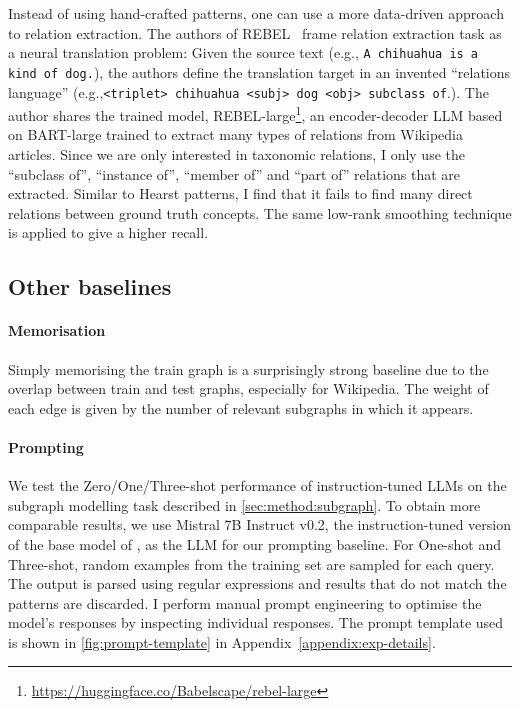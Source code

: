 Instead of using hand-crafted patterns, one can use a more data-driven approach to relation extraction. The authors of REBEL~\cite{cabot2021rebel} frame relation extraction task as a neural translation problem: Given the source text (e.g., \texttt{A chihuahua is a kind of dog.}), the authors define the translation target in an invented ``relations language'' (e.g.,\texttt{<triplet> chihuahua <subj> dog <obj> subclass of}.). The author shares the trained model, REBEL-large\footnote{\url{https://huggingface.co/Babelscape/rebel-large}}, an encoder-decoder LLM based on BART-large \cite{lewis2019bart} trained to extract many types of relations from Wikipedia articles. Since we are only interested in taxonomic relations, I only use the ``subclass of'', ``instance of'', ``member of'' and ``part of'' relations that are extracted. Similar to Hearst patterns, I find that it fails to find many direct relations between ground truth concepts. The same low-rank smoothing technique is applied to give a higher recall.


\subsection{Other baselines}

\paragraph{Memorisation}
Simply memorising the train graph is a surprisingly strong baseline due to the overlap between train and test graphs, especially for Wikipedia. The weight of each edge is given by the number of relevant subgraphs in which it appears.

\paragraph{Prompting}
We test the Zero/One/Three-shot performance of instruction-tuned LLMs on the subgraph modelling task described in \cref{sec:method:subgraph}. To obtain more comparable results, we use Mistral 7B Instruct v0.2, the instruction-tuned version of the base model of \name, as the LLM for our prompting baseline. For One-shot and Three-shot, random examples from the training set are sampled for each query. The output is parsed using regular expressions and results that do not match the patterns are discarded. I perform manual prompt engineering to optimise the model's responses by inspecting individual responses. The prompt template used is shown in \cref{fig:prompt-template} in Appendix~\ref{appendix:exp-details}.



